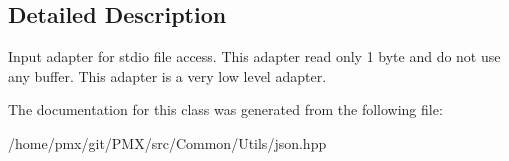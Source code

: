 \subsection{Detailed Description}
Input adapter for stdio file access. This adapter read only 1 byte and do not use any buffer. This adapter is a very low level adapter. 

The documentation for this class was generated from the following file\+:\begin{DoxyCompactItemize}
\item 
/home/pmx/git/\+P\+M\+X/src/\+Common/\+Utils/json.\+hpp\end{DoxyCompactItemize}
